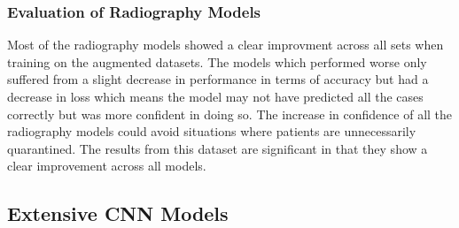 \subsubsection{Evaluation of Radiography Models}
Most of the radiography models showed a clear improvment across all sets when training on the augmented datasets.  The models which performed worse only suffered from a slight decrease in performance in terms of accuracy but had a decrease in loss which means the model may not have predicted all the cases correctly but was more confident in doing so.  The increase in confidence of all the radiography models could avoid situations where patients are unnecessarily quarantined.  The results from this dataset are significant in that they show a clear improvement across all models.
\subsection{Extensive CNN Models}
